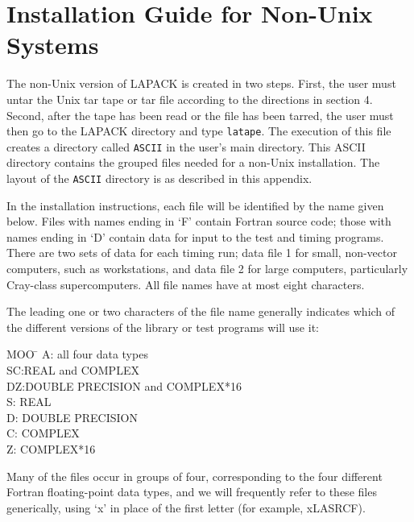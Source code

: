 \chapter{Installation Guide for Non-Unix Systems}

The non-Unix version of LAPACK is created in two steps.  First, the user
must untar the Unix tar tape or tar file according to the directions 
in section 4.
Second, after the tape has been read or the file has been tarred, the 
user must then go to the
LAPACK directory and type {\tt latape}.  The execution of this file
creates a directory called {\tt ASCII} in the user's main directory.
This ASCII directory contains the grouped files needed for a non-Unix
installation.  The layout of the {\tt ASCII} directory is as described
in this appendix.

In the installation instructions, each file will be
identified by the name given below.
Files with names ending in `F' contain Fortran source code; 
those with names ending in `D' contain data for input
to the test and timing programs.
There are two sets of data for each timing run;
data file 1 for small, non-vector computers, such as workstations, and
data file 2 for large computers, particularly Cray-class supercomputers.
All file names have at most eight characters.

The leading one or two characters of the file name generally
indicates which of the different versions of the library or
test programs will use it:

\begin{tabbing}
MOO  \= \kill
A: \>all four data types \\
SC:\>REAL and COMPLEX \\
DZ:\>DOUBLE PRECISION and COMPLEX*16 \\
S: \>REAL \\
D: \>DOUBLE PRECISION \\
C: \>COMPLEX \\
Z: \>COMPLEX*16
\end{tabbing}

\noindent
Many of the files occur in groups of four, corresponding to
the four different Fortran floating-point data types,
and we will frequently
refer to these files generically, using `x' in place of the first
letter (for example, xLASRCF).

